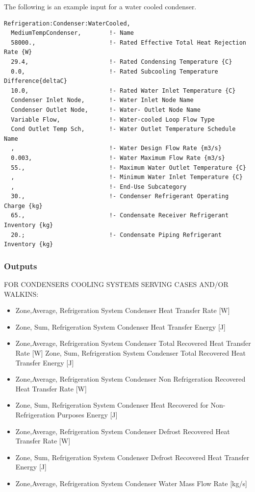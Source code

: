 The following is an example input for a water cooled condenser.

\begin{lstlisting}
Refrigeration:Condenser:WaterCooled,
  MediumTempCondenser,        !- Name
  58000.,                     !- Rated Effective Total Heat Rejection Rate {W}
  29.4,                       !- Rated Condensing Temperature {C}
  0.0,                        !- Rated Subcooling Temperature Difference{deltaC}
  10.0,                       !- Rated Water Inlet Temperature {C}
  Condenser Inlet Node,       !- Water Inlet Node Name
  Condenser Outlet Node,      !- Water- Outlet Node Name
  Variable Flow,              !- Water-cooled Loop Flow Type
  Cond Outlet Temp Sch,       !- Water Outlet Temperature Schedule Name
  ,                           !- Water Design Flow Rate {m3/s}
  0.003,                      !- Water Maximum Flow Rate {m3/s}
  55.,                        !- Maximum Water Outlet Temperature {C}
  ,                           !- Minimum Water Inlet Temperature {C}
  ,                           !- End-Use Subcategory
  30.,                        !- Condenser Refrigerant Operating Charge {kg}
  65.,                        !- Condensate Receiver Refrigerant Inventory {kg}
  20.;                        !- Condensate Piping Refrigerant Inventory {kg}
\end{lstlisting}

\subsubsection{Outputs}\label{outputs-8-007}

FOR CONDENSERS COOLING SYSTEMS SERVING CASES AND/OR WALKINS:

\begin{itemize}
\item
  Zone,Average, Refrigeration System Condenser Heat Transfer Rate {[}W{]}
\item
  Zone, Sum, Refrigeration System Condenser Heat Transfer Energy {[}J{]}
\item
  Zone,Average, Refrigeration System Condenser Total Recovered Heat Transfer Rate {[}W{]} Zone, Sum, Refrigeration System Condenser Total Recovered Heat Transfer Energy {[}J{]}
\item
  Zone,Average, Refrigeration System Condenser Non Refrigeration Recovered Heat Transfer Rate {[}W{]}
\item
  Zone, Sum, Refrigeration System Condenser Heat Recovered for Non-Refrigeration Purposes Energy {[}J{]}
\item
  Zone,Average, Refrigeration System Condenser Defrost Recovered Heat Transfer Rate {[}W{]}
\item
  Zone, Sum, Refrigeration System Condenser Defrost Recovered Heat Transfer Energy {[}J{]}
\item
  Zone,Average, Refrigeration System Condenser Water Mass Flow Rate {[}kg/s{]}
\end{itemize}

